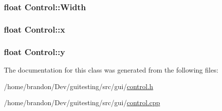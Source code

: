 \hypertarget{class_control_a485c96e0ce271b1245ddd2d6bd79675}{
\subsubsection[{Width}]{\setlength{\rightskip}{0pt plus 5cm}float {\bf Control::Width}}}
\label{class_control_a485c96e0ce271b1245ddd2d6bd79675}


\hypertarget{class_control_a73c00d4474d4eec453c5d8ccda1566d}{
\subsubsection[{x}]{\setlength{\rightskip}{0pt plus 5cm}float {\bf Control::x}}}
\label{class_control_a73c00d4474d4eec453c5d8ccda1566d}


\hypertarget{class_control_f2d14a39b8112081f36876da68c1bf0e}{
\subsubsection[{y}]{\setlength{\rightskip}{0pt plus 5cm}float {\bf Control::y}}}
\label{class_control_f2d14a39b8112081f36876da68c1bf0e}




The documentation for this class was generated from the following files:\begin{CompactItemize}
\item 
/home/brandon/Dev/guitesting/src/gui/\hyperlink{control_8h}{control.h}\item 
/home/brandon/Dev/guitesting/src/gui/\hyperlink{control_8cpp}{control.cpp}\end{CompactItemize}

